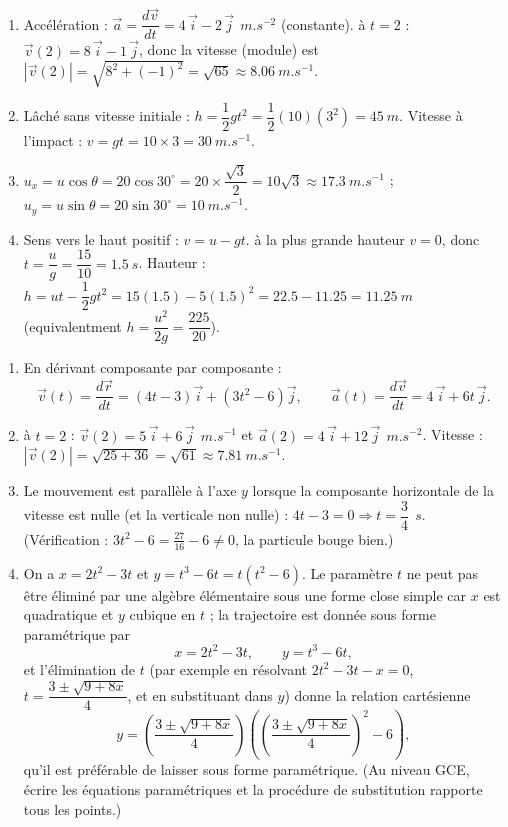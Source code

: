\documentclass[11pt]{article}
\begin{document}
\begin{corrige}
\begin{enumerate}
\item Acc\'el\'eration : $\vec{a} = \dfrac{d\vec{v}}{dt} = 4\,\vec{i} - 2\,\vec{j}\ \SI{}{m.s^{-2}}$ (constante). \`a $t = 2$ : $\vec{v}(2) = 8\,\vec{i} - 1\,\vec{j}$, donc la vitesse (module) est $|\vec{v}(2)| = \sqrt{8^2 + (-1)^2} = \sqrt{65} \approx \SI{8.06}{m.s^{-1}}$.
\item L\^ach\'e sans vitesse initiale : $h = \dfrac{1}{2}gt^2 = \dfrac{1}{2}(10)(3^2) = \SI{45}{m}$. Vitesse \`a l'impact : $v = gt = 10 \times 3 = \SI{30}{m.s^{-1}}$.
\item $u_x = u\cos\theta = 20\cos 30^\circ = 20 \times \dfrac{\sqrt{3}}{2} = 10\sqrt{3} \approx \SI{17.3}{m.s^{-1}}$ ; $u_y = u\sin\theta = 20\sin 30^\circ = \SI{10}{m.s^{-1}}$.
\item Sens vers le haut positif : $v = u - gt$. \`a la plus grande hauteur $v = 0$, donc $t = \dfrac{u}{g} = \dfrac{15}{10} = \SI{1.5}{s}$. Hauteur : $h = ut - \dfrac{1}{2}gt^2 = 15(1.5) - 5(1.5)^2 = 22.5 - 11.25 = \SI{11.25}{m}$ (equivalentment $h = \dfrac{u^2}{2g} = \dfrac{225}{20}$).
\end{enumerate}
\end{corrige}

\begin{corrige}
\begin{enumerate}
\item En d\'erivant composante par composante :
\[ \vec{v}(t) = \frac{d\vec{r}}{dt} = (4t - 3)\vec{i} + (3t^2 - 6)\vec{j}, \qquad \vec{a}(t) = \frac{d\vec{v}}{dt} = 4\,\vec{i} + 6t\,\vec{j}. \]
\item \`a $t = 2$ : $\vec{v}(2) = 5\,\vec{i} + 6\,\vec{j}\ \SI{}{m.s^{-1}}$ et $\vec{a}(2) = 4\,\vec{i} + 12\,\vec{j}\ \SI{}{m.s^{-2}}$. Vitesse : $|\vec{v}(2)| = \sqrt{25 + 36} = \sqrt{61} \approx \SI{7.81}{m.s^{-1}}$.
\item Le mouvement est parall\`ele \`a l'axe $y$ lorsque la composante horizontale de la vitesse est nulle (et la verticale non nulle) : $4t - 3 = 0 \Rightarrow t = \dfrac{3}{4}\ \SI{}{s}$. (V\'erification : $3t^2 - 6 = \frac{27}{16} - 6 \neq 0$, la particule bouge bien.)
\item On a $x = 2t^2 - 3t$ et $y = t^3 - 6t = t(t^2 - 6)$. Le param\`etre $t$ ne peut pas \^etre \'elimin\'e par une alg\`ebre \'el\'ementaire sous une forme close simple car $x$ est quadratique et $y$ cubique en $t$ ; la trajectoire est donn\'ee sous forme param\'etrique par
\[ x = 2t^2 - 3t, \qquad y = t^3 - 6t, \]
et l'\'elimination de $t$ (par exemple en r\'esolvant $2t^2 - 3t - x = 0$, $t = \dfrac{3 \pm \sqrt{9 + 8x}}{4}$, et en substituant dans $y$) donne la relation cart\'esienne
\[ y = \left(\frac{3 \pm \sqrt{9+8x}}{4}\right)\left(\left(\frac{3 \pm \sqrt{9+8x}}{4}\right)^{\!2} - 6\right), \]
qu'il est pr\'ef\'erable de laisser sous forme param\'etrique. (Au niveau GCE, \'ecrire les \'equations param\'etriques et la proc\'edure de substitution rapporte tous les points.)
\end{enumerate}
\end{corrige}
\end{document}
